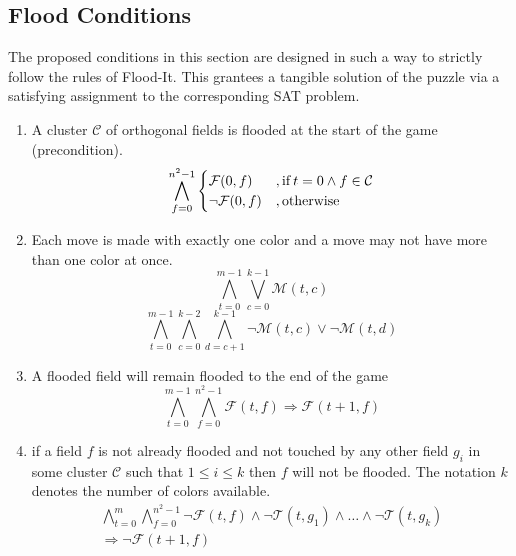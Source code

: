 \documentclass[conference]{IEEEtran}
\newcommand{\nMoves}{\ensuremath{m}\xspace}
\newcommand{\bSize}{\ensuremath{n}\xspace}
\newcommand{\clr}{\ensuremath{c}\xspace}
\newcommand{\nColors}{\ensuremath{k}\xspace}
\newcommand{\flood}[2]{\ensuremath{\mathcal{F}(#1,#2)}\xspace}
\newcommand{\move}[2]{\ensuremath{\mathcal{M}(#1,#2)}\xspace}
\newcommand{\touch}[2]{\ensuremath{\mathcal{T}(#1,#2)}\xspace}
\newcommand{\turn}{\ensuremath{t}\xspace}
\newcommand{\field}{\ensuremath{f}\xspace}
\newcommand{\cluster}{\ensuremath{\mathcal{C}}\xspace}
\begin{document}
\subsection{Flood Conditions}
The proposed conditions in this section are designed in such a way to strictly follow the rules of Flood-It. This grantees a tangible solution of the puzzle via a satisfying assignment to the corresponding SAT problem.
\begin{enumerate}
	\item A cluster \cluster of orthogonal fields is flooded at the start of the game (precondition).
	\begin{equation}
	\bigwedge_{\field=0}^{{\bSize^2}-1}
	\begin{cases}
	\flood{0}{\field}&, \text{if\:} \turn=0\wedge\field\in\cluster\\
	\neg\flood{0}{\field}&, \text{otherwise}\\
	\end{cases}
	\end{equation}
	\item Each move is made with exactly one color and a move may not have more than one color at once.
	\begin{equation}
	\bigwedge_{\turn=0}^{\nMoves-1}
	\bigvee_{\clr=0}^{\nColors-1}
	\move{\turn}{\clr}
	\end{equation}
	\begin{equation}
	\bigwedge_{\turn=0}^{\nMoves-1}
	\bigwedge_{\clr=0}^{\nColors-2}
	\bigwedge_{d=\clr+1}^{\nColors-1}
	\neg\move{\turn}{\clr}\vee
	\neg\move{\turn}{d}
	\end{equation}
	\item A flooded field will remain flooded to the end of the game
	\begin{equation}
	\bigwedge_{\turn=0}^{\nMoves-1}
	\bigwedge_{\field=0}^{{\bSize^2}-1}
	\flood{\turn}{\field}\Rightarrow\flood{\turn+1}{\field}
	\end{equation}
	\item if a field \field is not already flooded and not touched by any other field $g_i$ in some cluster \cluster such that $1\leq i \leq k$ then \field will not be flooded. The notation $k$ denotes the number of colors available.
	\begin{multline}
	\bigwedge_{\turn=0}^{\nMoves}
	\bigwedge_{\field=0}^{{\bSize^2}-1}
	\neg\flood{\turn}{\field}\wedge\neg\touch{\turn}{g_1}\wedge\dots\wedge\neg\touch{\turn}{g_k}\\
	\Rightarrow\neg\flood{\turn+1}{\field}
	\end{multline}

\end{enumerate}
\end{document}

